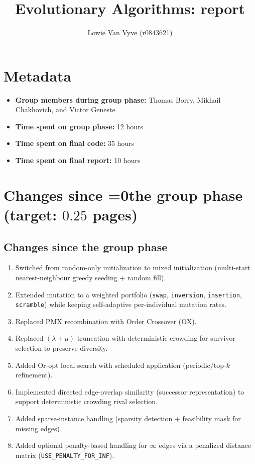 \documentclass[a4paper,10pt]{article}
\title{\vspace{-2cm}Evolutionary Algorithms: \switch{Final}{Retake} report}
\author{Lowie Van Vyve (r0843621)}
\def\retake{0}
\newcommand{\switch}[2]{\ifnum\retake=0{#1}\else{#2}\fi}
\begin{document}
\selectfont{}

\maketitle

\section{Metadata}

\begin{itemize}
 \item \textbf{Group members during group phase:} Thomas Borry, Mikhail Chakhovich, and Victor Geneste
 \item \textbf{Time spent on group phase:} 12 hours
 \item \textbf{Time spent on final code:} 35 hours
 \item \textbf{Time spent on final report:} 10 hours
\end{itemize}

\section{Changes since \switch{the group phase}{your previous submission} \hfill(target: $0.25$ pages)}

\subsection{Changes since the group phase}
\begin{enumerate}
  \item Switched from random-only initialization to mixed initialization (multi-start nearest-neighbour greedy seeding + random fill).
  \item Extended mutation to a weighted portfolio (\texttt{swap}, \texttt{inversion}, \texttt{insertion}, \texttt{scramble}) while keeping self-adaptive per-individual mutation rates.
  \item Replaced PMX recombination with Order Crossover (OX).
  \item Replaced $(\lambda+\mu)$ truncation with deterministic crowding for survivor selection to preserve diversity.
  \item Added Or-opt local search with scheduled application (periodic/top-$k$ refinement).
  \item Implemented directed edge-overlap similarity (successor representation) to support deterministic crowding rival selection.
  \item Added sparse-instance handling (sparsity detection + feasibility mask for missing edges).
  \item Added optional penalty-based handling for $\infty$ edges via a penalized distance matrix (\texttt{USE\_PENALTY\_FOR\_INF}).
\end{enumerate}
\end{document}
